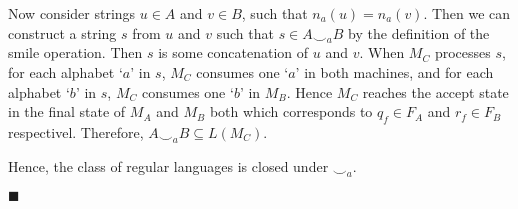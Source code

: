 \documentclass[addpoints]{exam}
\begin{document}
\begin{questions}
\begin{solution}
	Now consider strings $u \in A$ and $v \in B$, such that $ n_a(u) = n_a(v) $. Then we can construct a string $s$ from $u$ and $v$ such that $ s \in A \smile_a B $ by the definition of the smile operation. Then $s$ is some concatenation of $u$ and $v$. When $M_C$ processes $s$, for each alphabet `$a$' in $s$, $M_C$ consumes one `$a$' in both machines, and for each alphabet `$b$' in $s$, $M_C$ consumes one `$b$' in $M_B$. Hence $M_C$ reaches the accept state in the final state of $M_A$ and $M_B$ both which corresponds to $ q_f \in F_A $ and $ r_f \in F_B $ respectivel. Therefore, $A \smile_a B \subseteq L(M_C)$. 

	Hence, the class of regular languages is closed under $\smile_a$.
	\begin{flushright}
		$\blacksquare$
	\end{flushright}

\end{solution}
\end{questions}
\end{document}
